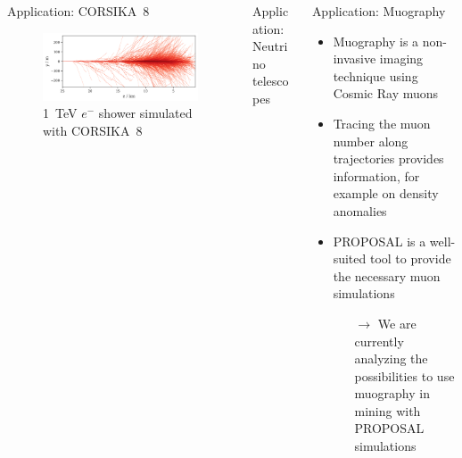 \documentclass[t]{beamer}
\newlength{\thirdtextwidth}
\newlength{\itemseparation}
\begin{document}
\begin{columns}[onlytextwidth]
\begin{column}{\thirdtextwidth}
\begin{block}[equal height group=B]{Application: CORSIKA~8}
              \begin{figure}
                \centering
                \includegraphics[width=0.8\linewidth, height=.4\textheight, keepaspectratio]{plots/shower_horizonal.png}
                \caption*{\SI{1}{\tera\electronvolt} $e^-$ shower simulated with CORSIKA~8}
              \end{figure}
      \end{block}%
    \end{column}%
    \begin{column}{\thirdtextwidth}%
      \begin{block}[equal height group=B]{Application: Neutrino telescopes}%

      \end{block}
    \end{column}

    \begin{column}{\thirdtextwidth}%
      \begin{block}[equal height group=B]{Application: Muography}%
        \begin{itemize}
          \setlength\itemsep{\itemseparation}
          \item Muography is a non-invasive imaging technique using Cosmic Ray muons
          \item Tracing the muon number along trajectories provides information, for example on density anomalies
          \item PROPOSAL is a well-suited tool to provide the necessary muon simulations
          \begin{itemize}
            \setlength\itemsep{\itemseparation}
            \item[$\rightarrow$] We are currently analyzing the possibilities to use muography in mining with PROPOSAL simulations
          \end{itemize} 
        \end{itemize}
      \vspace{2em}
        \begin{figure}
            \begin{tikzpicture}[scale=2.5, every node/.style={scale=0.85}]
                \centering


\end{tikzpicture}
\end{figure}
\end{block}
\end{column}
\end{columns}
\end{document}

